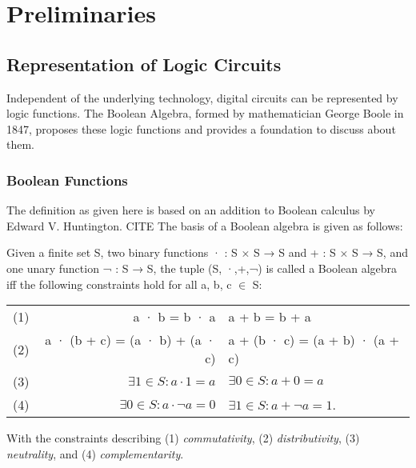 \chapter{Preliminaries}\label{chapter:Preliminaries}

\section{Representation of Logic Circuits}
Independent of the underlying technology, digital circuits can be represented by logic functions. The Boolean Algebra, formed by mathematician George Boole in 1847, proposes these logic functions and provides a foundation to discuss about them.

\subsection{Boolean Functions}\label{subsec:boolfunc}
The definition as given here is based on an addition to Boolean calculus by Edward V. Huntington. CITE
The basis of a Boolean algebra is given as follows:

\begin{definition}\label{Def:BasBool}
Given a finite set S, two binary functions · : S × S → S and + :
S × S → S, and one unary function ¬ : S → S, the tuple (S, ·,+,¬) is called a
Boolean algebra iff the following constraints hold for all a, b, c $\in$ S: \\

\centering
\begin{tabular}{l r l}

	     (1) & a · b = b · a & a + b = b + a \\

	     (2) &a · (b + c) = (a · b) + (a · c) & a + (b · c) = (a + b) · (a + c) \\
	     (3) & $\exists 1 \in S : a \cdot 1 = a$ &  $\exists 0 \in S : a + 0 = a$ \\
	     (4) &$\exists 0 \in S : a \cdot \neg a = 0$ & $\exists 1 \in S : a + \neg a = 1$. \\

\end{tabular}

\end{definition}

With the constraints describing (1) \textit{commutativity}, (2) \textit{distributivity}, (3) \textit{neutrality}, and (4)
\textit{complementarity}.\\

